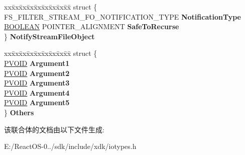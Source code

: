 \begin{DoxyCompactItemize}
\begin{tabbing}
\end{tabbing}\item 
\mbox{\label{union___f_s___f_i_l_t_e_r___p_a_r_a_m_e_t_e_r_s_adec78039a92c14da2e48ae6f1af95384}} 
\begin{tabbing}
xx\=xx\=xx\=xx\=xx\=xx\=xx\=xx\=xx\=\kill
struct \{\\
\>FS\_FILTER\_STREAM\_FO\_NOTIFICATION\_TYPE {\bfseries NotificationType}\\
\>\hyperlink{_processor_bind_8h_a112e3146cb38b6ee95e64d85842e380a}{BOOLEAN} POINTER\_ALIGNMENT {\bfseries SafeToRecurse}\\
\} {\bfseries NotifyStreamFileObject}\\

\end{tabbing}\item 
\mbox{\label{union___f_s___f_i_l_t_e_r___p_a_r_a_m_e_t_e_r_s_a17cac76ae6281e7edf78b033d9cf0ea4}} 
\begin{tabbing}
xx\=xx\=xx\=xx\=xx\=xx\=xx\=xx\=xx\=\kill
struct \{\\
\>\hyperlink{interfacevoid}{PVOID} {\bfseries Argument1}\\
\>\hyperlink{interfacevoid}{PVOID} {\bfseries Argument2}\\
\>\hyperlink{interfacevoid}{PVOID} {\bfseries Argument3}\\
\>\hyperlink{interfacevoid}{PVOID} {\bfseries Argument4}\\
\>\hyperlink{interfacevoid}{PVOID} {\bfseries Argument5}\\
\} {\bfseries Others}\\

\end{tabbing}\end{DoxyCompactItemize}


该联合体的文档由以下文件生成\+:\begin{DoxyCompactItemize}
\item 
E\+:/\+React\+O\+S-\/0../sdk/include/xdk/iotypes.\+h\end{DoxyCompactItemize}
